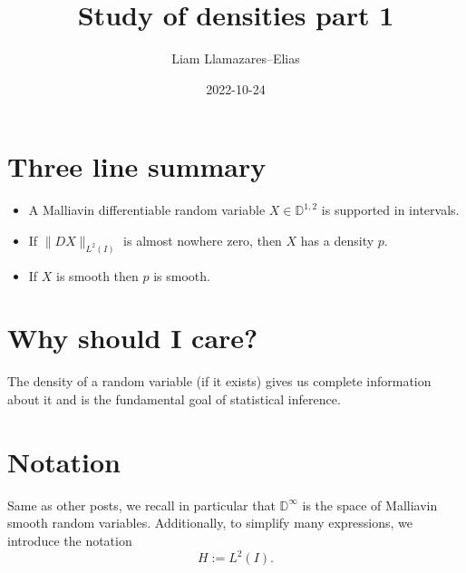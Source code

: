 \documentclass[
    a4paper,
    DIV=14,
    abstract=true,
    numbers=noenddot
]{scrartcl}
\begin{document}
	\title{Study of densities part 1}
	\author{Liam Llamazares--Elias}
	\date{2022-10-24}
	\maketitle
	\section{Three line summary}
	\begin{itemize}
		\item A Malliavin differentiable random variable $X\in \mathbb{D}^{1,2}$ is supported in intervals.
		\item If $\|DX\|_{L^2(I)}$ is almost nowhere zero, then  $X$ has a density  $p$.
		\item If  $X$ is smooth then  $p$ is smooth.
	\end{itemize}
	\section{Why should I care?}
	The density of a random variable (if it exists) gives us complete information about it and is the fundamental goal of statistical inference.
	\section{Notation}
	Same as other posts, we recall in particular that $\mathbb{D}^\infty$ is the space of Malliavin smooth random variables. Additionally, to simplify many expressions, we  introduce the notation
	\begin{equation*}
		H:=L^2(I).
	\end{equation*}
\end{document}
